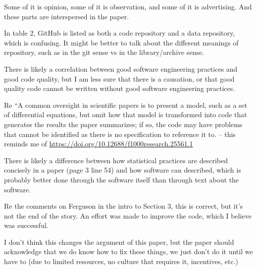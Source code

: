 \documentclass[11pt]{article}
\begin{document}
Some of it is opinion, some of it is observation, and some of it is advertising. And these parts are interspersed in the paper.

In table 2, GitHub is listed as both a code repository and a data repository, which is confusing.  It might be better to talk about the different meanings of repository, such as in the git sense vs in the library/archive sense.  

There is likely a correlation between good software engineering practices and good code quality, but I am less sure that there is a causation, or that good quality code cannot be written without good software engineering practices.

Re ``A common oversight in scientific papers is to present a model, such as a set of differential equations, but omit how that model is transformed into code that generates the results the paper summarizes; if so, the code may have problems that cannot be identified as there is no specification to reference it to. -- this reminds me of \url{https://doi.org/10.12688/f1000research.25561.1} 

There is likely a difference between how statistical practices are described concisely in a paper (page 3 line 54) and how software can described, which is probably better done through the software itself than through text about the software. 

Re the comments on Ferguson in the intro to Section 3, this is correct, but it's not the end of the story. An effort was made to improve the code, which I believe was successful. 

I don't think this changes the argument of this paper, but the paper should acknowledge that we do know how to fix these things, we just don't do it until we have to (due to limited resources, no culture that requires it, incentives, etc.) 
\end{document}
